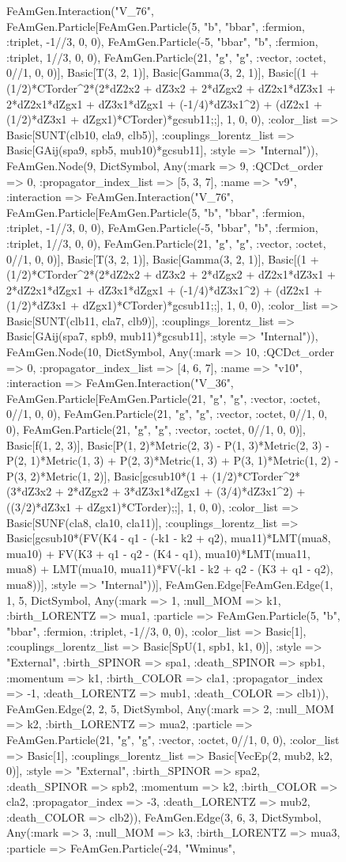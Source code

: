 \documentclass{revtex4}
\begin{document}
\begin{figure}[!htb]
\begin{center}
{FeAmGen.Interaction("V_76", FeAmGen.Particle[FeAmGen.Particle(5, "b", "bbar", :fermion, :triplet, -1//3, 0, 0), FeAmGen.Particle(-5, "bbar", "b", :fermion, :triplet, 1//3, 0, 0), FeAmGen.Particle(21, "g", "g", :vector, :octet, 0//1, 0, 0)], Basic[T(3, 2, 1)], Basic[Gamma(3, 2, 1)], Basic[(1 + (1/2)*CTorder^2*(2*dZ2x2 + dZ3x2 + 2*dZgx2 + dZ2x1*dZ3x1 + 2*dZ2x1*dZgx1 + dZ3x1*dZgx1 + (-1/4)*dZ3x1^2) + (dZ2x1 + (1/2)*dZ3x1 + dZgx1)*CTorder)*gcsub11;;], 1, 0, 0), :color_list => Basic[SUNT(clb10, cla9, clb5)], :couplings_lorentz_list => Basic[GAij(spa9, spb5, mub10)*gcsub11], :style => "Internal")), FeAmGen.Node(9, Dict{Symbol, Any}(:mark => 9, :QCDct_order => 0, :propagator_index_list => [5, 3, 7], :name => "v9", :interaction => FeAmGen.Interaction("V_76", FeAmGen.Particle[FeAmGen.Particle(5, "b", "bbar", :fermion, :triplet, -1//3, 0, 0), FeAmGen.Particle(-5, "bbar", "b", :fermion, :triplet, 1//3, 0, 0), FeAmGen.Particle(21, "g", "g", :vector, :octet, 0//1, 0, 0)], Basic[T(3, 2, 1)], Basic[Gamma(3, 2, 1)], Basic[(1 + (1/2)*CTorder^2*(2*dZ2x2 + dZ3x2 + 2*dZgx2 + dZ2x1*dZ3x1 + 2*dZ2x1*dZgx1 + dZ3x1*dZgx1 + (-1/4)*dZ3x1^2) + (dZ2x1 + (1/2)*dZ3x1 + dZgx1)*CTorder)*gcsub11;;], 1, 0, 0), :color_list => Basic[SUNT(clb11, cla7, clb9)], :couplings_lorentz_list => Basic[GAij(spa7, spb9, mub11)*gcsub11], :style => "Internal")), FeAmGen.Node(10, Dict{Symbol, Any}(:mark => 10, :QCDct_order => 0, :propagator_index_list => [4, 6, 7], :name => "v10", :interaction => FeAmGen.Interaction("V_36", FeAmGen.Particle[FeAmGen.Particle(21, "g", "g", :vector, :octet, 0//1, 0, 0), FeAmGen.Particle(21, "g", "g", :vector, :octet, 0//1, 0, 0), FeAmGen.Particle(21, "g", "g", :vector, :octet, 0//1, 0, 0)], Basic[f(1, 2, 3)], Basic[P(1, 2)*Metric(2, 3) - P(1, 3)*Metric(2, 3) - P(2, 1)*Metric(1, 3) + P(2, 3)*Metric(1, 3) + P(3, 1)*Metric(1, 2) - P(3, 2)*Metric(1, 2)], Basic[gcsub10*(1 + (1/2)*CTorder^2*(3*dZ3x2 + 2*dZgx2 + 3*dZ3x1*dZgx1 + (3/4)*dZ3x1^2) + ((3/2)*dZ3x1 + dZgx1)*CTorder);;], 1, 0, 0), :color_list => Basic[SUNF(cla8, cla10, cla11)], :couplings_lorentz_list => Basic[gcsub10*(FV(K4 - q1 - (-k1 - k2 + q2), mua11)*LMT(mua8, mua10) + FV(K3 + q1 - q2 - (K4 - q1), mua10)*LMT(mua11, mua8) + LMT(mua10, mua11)*FV(-k1 - k2 + q2 - (K3 + q1 - q2), mua8))], :style => "Internal"))], FeAmGen.Edge[FeAmGen.Edge(1, 1, 5, Dict{Symbol, Any}(:mark => 1, :null_MOM => k1, :birth_LORENTZ => mua1, :particle => FeAmGen.Particle(5, "b", "bbar", :fermion, :triplet, -1//3, 0, 0), :color_list => Basic[1], :couplings_lorentz_list => Basic[SpU(1, spb1, k1, 0)], :style => "External", :birth_SPINOR => spa1, :death_SPINOR => spb1, :momentum => k1, :birth_COLOR => cla1, :propagator_index => -1, :death_LORENTZ => mub1, :death_COLOR => clb1)), FeAmGen.Edge(2, 2, 5, Dict{Symbol, Any}(:mark => 2, :null_MOM => k2, :birth_LORENTZ => mua2, :particle => FeAmGen.Particle(21, "g", "g", :vector, :octet, 0//1, 0, 0), :color_list => Basic[1], :couplings_lorentz_list => Basic[VecEp(2, mub2, k2, 0)], :style => "External", :birth_SPINOR => spa2, :death_SPINOR => spb2, :momentum => k2, :birth_COLOR => cla2, :propagator_index => -3, :death_LORENTZ => mub2, :death_COLOR => clb2)), FeAmGen.Edge(3, 6, 3, Dict{Symbol, Any}(:mark => 3, :null_MOM => k3, :birth_LORENTZ => mua3, :particle => FeAmGen.Particle(-24, "Wminus", }
\end{center}
\end{figure}
\end{document}
